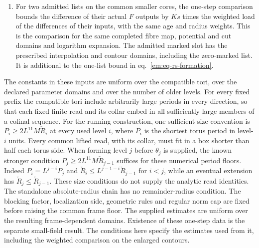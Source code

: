 \documentclass[11pt,letterpaper,reqno]{amsart}
\numberwithin{equation}{section}
\renewcommand{\eqref}[1]{\textup{eq.~\ref{#1}}}
\theoremstyle{definition}
\theoremstyle{remark}
\begin{document}
\begin{enumerate}
  \[
   \sum_{X,z}N_{k+1}(X,P_{k+1}(W),z)
        =\log Z_k(W)-\log Z_k(1),
  \]
  where $Z_k(W)$ is the supplied actual constrained reference
  Gaussian normalizer without a fluctuation cut. Its logarithm
  has the fixed branch from the positive real normalizer. This
  identity identifies its curvature coefficient with that of the
  physical Gaussian normalization. In the physical action-only
  splitting the total of the
  Gaussian mismatch is field independent, by the Gaussian gauge
  normalization. Its scalar coefficient is zero, although its
  pointed norm need not have a small-coupling factor.
\item For two admitted lists on the common smaller cores, the one-step
  comparison bounds the difference of their actual $F$ outputs by
  $Ks$ times the weighted load of the differences of their inputs,
  with the same age and radius weights. This is the comparison for
  the same completed fibre map, potential and cut domains and
  logarithm expansion. The admitted marked slot has the prescribed
  interpolation and contour domains, including the zero-marked list.
  It is additional to the one-list bound in
  \eqref{em:eq-rs-formation}.
\end{enumerate}

The constants in these inputs are uniform over the compatible tori,
over the declared parameter domains and over the number of older levels.
For every fixed prefix the compatible tori include arbitrarily large
periods in every direction, so that each fixed finite read and its
collar embed in all sufficiently large members of a cofinal sequence.
For the running construction, one sufficient size convention is
$P_i\ge2L^{11}M\check R_i$ at every used level $i$, where $P_i$
is the shortest torus period in level-$i$ units. Every common
lifted read, with its collar, must fit in a box shorter than half
each torus side. When forming level $j$ before $\theta_j$ is
supplied, the known stronger condition
$P_j\ge2L^{11}M\check R_{j-1}$ suffices for these numerical period
floors. Indeed $P_i=L^{j-i}P_j$ and
$\check R_i\le L^{j-1-i}\check R_{j-1}$ for $i<j$, while an
eventual extension has $\check R_j\le\check R_{j-1}$. These size
conditions do not supply the analytic read identities. The
standalone absolute-radius chain has no remainder-radius condition.
The blocking factor, localization side, geometric rules and regular
norm cap are fixed before raising the common frame floor. The
supplied estimates are uniform over the resulting frame-dependent
domains. Existence of these one-step data is the separate
small-field result. The conditions here specify the estimates used from
it, including the weighted comparison on the enlarged contours.
\end{document}
